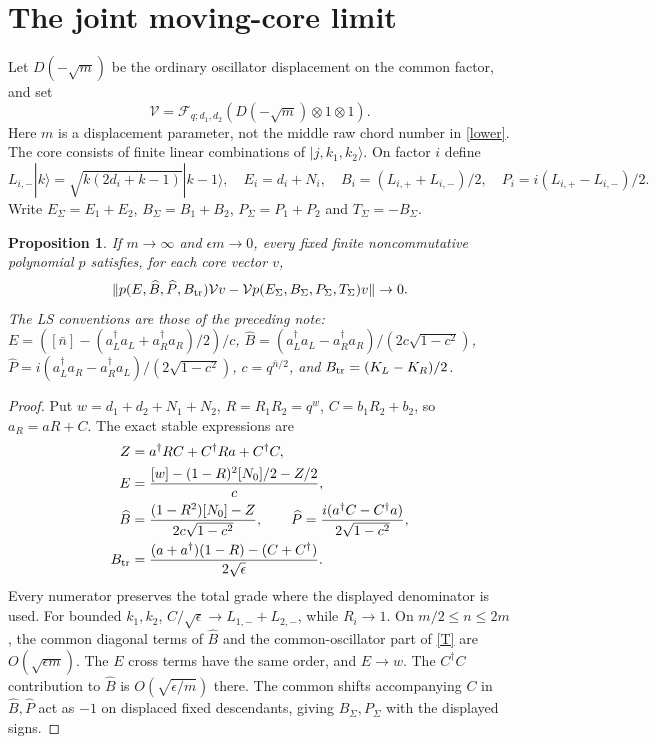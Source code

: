 \documentclass[11pt]{article}
\newtheorem{proposition}{Proposition}
\newcommand{\eps}{\epsilon}
\newcommand{\ket}[1]{|#1\rangle}
\newcommand{\B}{\widehat B}
\newcommand{\PP}{\widehat P}
\newcommand{\Bt}{B_{\rm tr}}
\newcommand{\V}{\mathcal V}
\begin{document}
\newpage
\section{The joint moving-core limit}
Let $D(-\sqrt m)$ be the ordinary oscillator displacement on
the common factor, and set
\begin{equation}
 \V=\mathcal F_{q;d_1,d_2}(D(-\sqrt m)\otimes1\otimes1).
\end{equation}
Here $m$ is a displacement parameter, not the middle raw
chord number in \eqref{lower}. The core consists of finite
linear combinations of $\ket{j,k_1,k_2}$.
On factor $i$ define
\[
 L_{i,-}\ket k=\sqrt{k(2d_i+k-1)}\ket{k-1},\quad
 E_i=d_i+N_i,\quad B_i=(L_{i,+}+L_{i,-})/2,
 \quad P_i=i(L_{i,+}-L_{i,-})/2.
\]
Write $E_\Sigma=E_1+E_2$, $B_\Sigma=B_1+B_2$,
$P_\Sigma=P_1+P_2$ and $T_\Sigma=-B_\Sigma$.

\begin{proposition}\label{limit}
If $m\to\infty$ and $\eps m\to0$, every fixed finite
noncommutative polynomial $p$ satisfies, for each core vector $v$,
\begin{equation}
 \|p(E,\B,\PP,\Bt)\V v
 -\V p(E_\Sigma,B_\Sigma,P_\Sigma,T_\Sigma)v\|\to0.
 \label{words}
\end{equation}
The LS conventions are those of the preceding note:
$E=([\bar n]-(a_L^\dagger a_L+a_R^\dagger a_R)/2)/c$,
$\B=(a_L^\dagger a_L-a_R^\dagger a_R)/(2c\sqrt{1-c^2})$,
$\PP=i(a_L^\dagger a_R-a_R^\dagger a_L)/(2\sqrt{1-c^2})$,
$c=q^{\bar n/2}$, and $\Bt=(K_L-K_R)/2$.
\end{proposition}
\begin{proof}
Put $w=d_1+d_2+N_1+N_2$, $R=R_1R_2=q^w$,
$C=b_1R_2+b_2$, so $a_R=aR+C$. The exact stable expressions are
\begin{align}
 Z&=a^\dagger RC+C^\dagger Ra+C^\dagger C,\nonumber\\
 E&=\frac{[w]-(1-R)^2[N_0]/2-Z/2}{c},\label{stable}\\
 \B&=\frac{(1-R^2)[N_0]-Z}{2c\sqrt{1-c^2}},\qquad
 \PP=\frac{i(a^\dagger C-C^\dagger a)}{2\sqrt{1-c^2}},\nonumber\\
 \Bt&=\frac{(a+a^\dagger)(1-R)-(C+C^\dagger)}{2\sqrt\eps}.
 \label{T}
\end{align}
Every numerator preserves the total grade where the displayed
denominator is used. For bounded $k_1,k_2$,
$C/\sqrt\eps\to L_{1,-}+L_{2,-}$, while $R_i\to1$.
On $m/2\le n\le2m$, the common diagonal terms of $\B$
and the common-oscillator part of \eqref{T} are
$O(\sqrt{\eps m})$. The $E$ cross terms have the same order,
and $E\to w$. The $C^\dagger C$ contribution to $\B$ is
$O(\sqrt{\eps/m})$ there. The common shifts accompanying
$C$ in $\B,\PP$ act as $-1$ on displaced fixed descendants,
giving $B_\Sigma,P_\Sigma$ with the displayed signs.
\end{proof}
\end{document}
